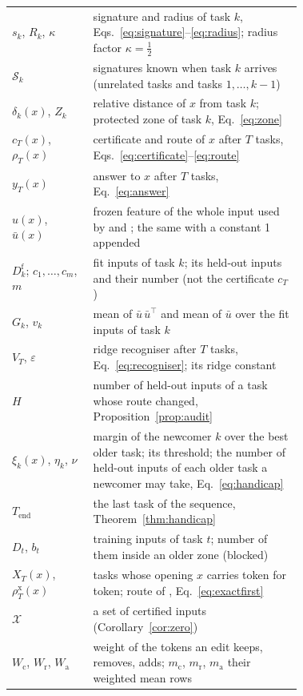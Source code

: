 \begin{table}[H]
\begin{tabular}{lp{0.72\linewidth}}
    $s_k$, $R_k$, $\kappa$ & signature and radius of task $k$, Eqs.~\eqref{eq:signature}--\eqref{eq:radius}; radius factor $\kappa = \tfrac{1}{2}$ \\
    $\mathcal{S}_k$ & signatures known when task $k$ arrives (unrelated tasks and tasks $1, \dots, k-1$) \\
    $\delta_k(x)$, $Z_k$ & relative distance of $x$ from task $k$; protected zone of task $k$, Eq.~\eqref{eq:zone} \\
    $c_T(x)$, $\rho_T(x)$ & certificate and route of $x$ after $T$ tasks, Eqs.~\eqref{eq:certificate}--\eqref{eq:route} \\
    $y_T(x)$ & answer to $x$ after $T$ tasks, Eq.~\eqref{eq:answer} \\
    $u(x)$, $\bar u(x)$ & frozen feature of the whole input used by \recog{} and \handicap{}; the same with a constant 1 appended \\
    $D_k^{\mathrm{f}}$; $c_1, \dots, c_m$, $m$ & fit inputs of task $k$; its held-out inputs and their number (not the certificate $c_T$) \\
    $G_k$, $v_k$ & mean of $\bar u\,\bar u^{\top}$ and mean of $\bar u$ over the fit inputs of task $k$ \\
    $V_T$, $\varepsilon$ & ridge recogniser after $T$ tasks, Eq.~\eqref{eq:recogniser}; its ridge constant \\
    $H$ & number of held-out inputs of a task whose route changed, Proposition~\ref{prop:audit} \\
    $\xi_k(x)$, $\eta_k$, $\nu$ & margin of the newcomer $k$ over the best older task; its threshold; the number of held-out inputs of each older task a newcomer may take, Eq.~\eqref{eq:handicap} \\
    $T_{\mathrm{end}}$ & the last task of the sequence, Theorem~\ref{thm:handicap} \\
        $D_t$, $b_t$ & training inputs of task $t$; number of them inside an older zone (blocked) \\
    $X_T(x)$, $\rho^{\mathrm{x}}_T(x)$ & tasks whose opening $x$ carries token for token; route of \exactfirst{}, Eq.~\eqref{eq:exactfirst} \\
    $\mathcal{X}$ & a set of certified inputs (Corollary~\ref{cor:zero}) \\
        $W_{\mathrm{c}}$, $W_{\mathrm{r}}$, $W_{\mathrm{a}}$ & weight of the tokens an edit keeps, removes, adds; $m_{\mathrm{c}}$, $m_{\mathrm{r}}$, $m_{\mathrm{a}}$ their weighted mean rows \\

\end{tabular}
\end{table}
